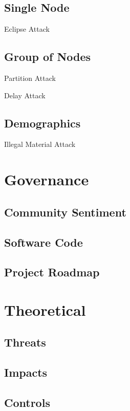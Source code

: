 \documentclass[11pt,a4paper,draft]{article}
\begin{document}
\subsection{Single Node}

Eclipse Attack

\subsection{Group of Nodes}

Partition Attack

Delay Attack

\subsection{Demographics}

Illegal Material Attack

\section{Governance}

\subsection{Community Sentiment}

\subsection{Software Code}

\subsection{Project Roadmap}

\section{Theoretical}

\subsection{Threats}

\subsection{Impacts}

\subsection{Controls}
\end{document}
